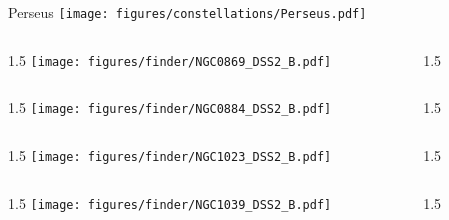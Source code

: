 \documentclass[final]{beamer}
\newlength{\colwidth}
\begin{document}

\begin{frame}[t]{\LARGE Perseus}
    \centering
    \texttt{[image: figures/constellations/Perseus.pdf]}
\end{frame}


\begin{frame}[t]{}
    \begin{columns}[T]
        \begin{column}{1.5\colwidth}
            \centering
            \texttt{[image: figures/finder/NGC0869\_DSS2\_B.pdf]}
        \end{column}
        \begin{column}{1.5\colwidth}
            \Large
            
        \end{column}
    \end{columns}
    \vspace{\fill}
    \begin{columns}[T]
        \begin{column}{1.5\colwidth}
            \centering
            \texttt{[image: figures/finder/NGC0884\_DSS2\_B.pdf]}
        \end{column}
        \begin{column}{1.5\colwidth}
            \Large
            
        \end{column}
    \end{columns}
\end{frame}


\begin{frame}[t]{}
    \begin{columns}[T]
        \begin{column}{1.5\colwidth}
            \centering
            \texttt{[image: figures/finder/NGC1023\_DSS2\_B.pdf]}
        \end{column}
        \begin{column}{1.5\colwidth}
            \Large
            
        \end{column}
    \end{columns}
    \vspace{\fill}
    \begin{columns}[T]
        \begin{column}{1.5\colwidth}
            \centering
            \texttt{[image: figures/finder/NGC1039\_DSS2\_B.pdf]}
        \end{column}
        \begin{column}{1.5\colwidth}
            \Large
            
        \end{column}
    \end{columns}
\end{frame}
\end{document}
